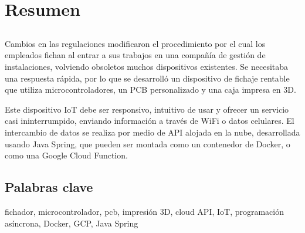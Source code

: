 \chapter*{Resumen}

\section*{\tituloPortadaVal}

Cambios en las regulaciones modificaron el procedimiento por el cual los empleados fichan al entrar a sus trabajos en una compañía 
de gestión de instalaciones, volviendo obsoletos muchos dispositivos existentes. Se necesitaba una respuesta rápida, por lo que se 
desarrolló un dispositivo de fichaje rentable que utiliza microcontroladores, un PCB personalizado y una caja impresa en 3D.

Este dispositivo IoT debe ser responsivo, intuitivo de usar y ofrecer un servicio casi ininterrumpido, enviando información a través
de WiFi o datos celulares. El intercambio de datos se realiza por medio de API alojada en la nube, desarrollada usando Java Spring,
que pueden ser montada como un contenedor de Docker, o como una Google Cloud Function.

\section*{Palabras clave}
   
\noindent fichador, microcontrolador, pcb, impresión 3D, cloud API, IoT, programación asíncrona, Docker, GCP, Java Spring

   


